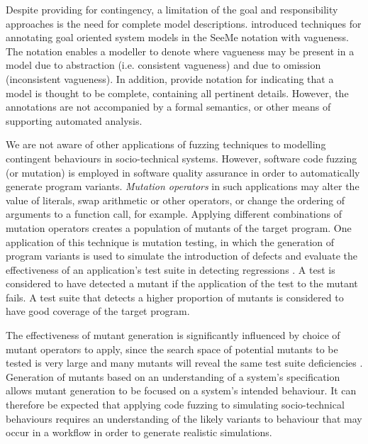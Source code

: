 \documentclass{sig-alternate}
\begin{document}
Despite providing for contingency, a limitation of the goal and responsibility approaches is the need for complete model
descriptions. \citet{Herrmann1999} introduced techniques for annotating goal oriented system models in the SeeMe
notation with vagueness.  The notation enables a modeller to denote where vagueness may be present in a model due to
abstraction (i.e. consistent vagueness) and due to omission (inconsistent vagueness).  In addition,
\citeauthor{Herrmann1999} provide notation for indicating that a model is thought to be complete, containing all
pertinent details.  However, the annotations are not accompanied by a formal semantics, or other means of supporting
automated analysis.

We are not aware of other applications of fuzzing techniques to modelling contingent behaviours in socio-technical
systems.  However, software code fuzzing (or mutation) is employed in software quality assurance in order to
automatically generate program variants.  \emph{Mutation operators} in such applications may alter the value of
literals, swap arithmetic or other operators, or change the ordering of arguments to a function call, for example.
Applying different combinations of mutation operators creates a population of mutants of the target program.  One
application of this technique is mutation testing, in which the generation of program variants is used to simulate the
introduction of defects and evaluate the effectiveness of an application's test suite in detecting regressions
\citep{demillo78hints}.  A test is considered to have detected a mutant if the application of the test to the mutant
fails.  A test suite that detects a higher proportion of mutants is considered to have good coverage of the target
program.

The effectiveness of mutant generation is significantly influenced by choice of mutant operators to apply, since the
search space of potential mutants to be tested is very large and many mutants will reveal the same test suite
deficiencies \citep{takanen08fuzzing}.  Generation of mutants based on an understanding of a system's specification
allows mutant generation to be focused on a system's intended behaviour.  It can therefore be expected that applying
code fuzzing to simulating socio-technical behaviours requires an understanding of the likely variants to behaviour that
may occur in a workflow in order to generate realistic simulations.
\end{document}
